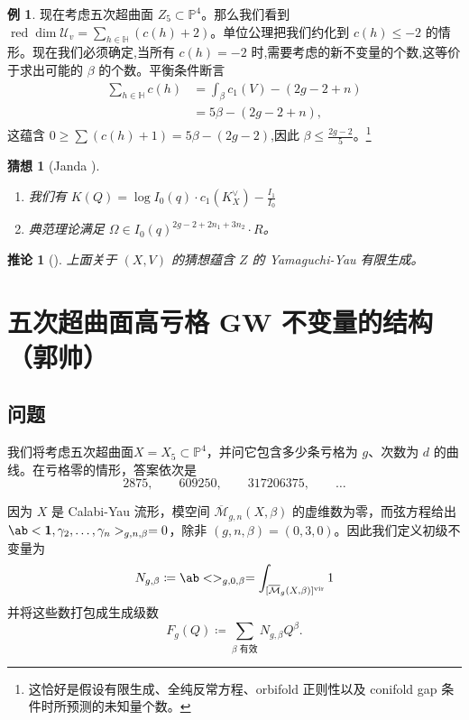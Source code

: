 \documentclass{amsart}
\newtheorem{cor}[thm]{推论}
\newtheorem{conj}[thm]{猜想}
\theoremstyle{definition}
\newtheorem{exm}[thm]{例}
\theoremstyle{remark}
\theoremstyle{plain}
\theoremstyle{definition}
\theoremstyle{remark}
\renewcommand{\H}{\mathbb{H}}
\renewcommand{\P}{\mathbb{P}}
\newcommand{\Mbar}{\overline{\mathcal{M}}}
\newcommand{\mc}[1]{\mathcal{#1}}
\newcommand{\mr}[1]{\mathrm{#1}}
\newcommand{\on}[1]{\operatorname{#1}}
\newcommand{\1}{\mathbf{1}}
\newcommand{\2}{\mathbf{2}}
\newcommand{\3}{\mathbf{3}}
\newcommand{\vir}{\mr{vir}}
\begin{document}
\begin{exm}
    现在考虑五次超曲面 \(Z_5 \subset \P^4\)。那么我们看到 \(\on{red}\dim \mc{U}_v = \sum_{h \in \H} (c(h)+2)\)。单位公理把我们约化到 \(c(h) \leq -2\) 的情形。现在我们必须确定,当所有 \(c(h) = -2\) 时,需要考虑的新不变量的个数,这等价于求出可能的 \(\beta\) 的个数。平衡条件断言
    \begin{align*}
        \sum_{h \in \H} c(h) &= \int_{\beta} c_1(V) - (2g-2+n) \\
        &= 5\beta - (2g-2+n),
    \end{align*}
    这蕴含 \(0 \geq \sum (c(h)+1) = 5\beta - (2g-2)\),因此 \(\beta \leq \frac{2g-2}{5}\)。\footnote{这恰好是假设有限生成、全纯反常方程、orbifold 正则性以及 conifold gap 条件时所预测的未知量个数。}
\end{exm}

\begin{conj}[Janda {\cite[Conjecture~1.6]{CJRtropical2025}}]\leavevmode
    \begin{enumerate}
        \item 我们有 \(K(Q) = \log I_0(q) \cdot c_1(K_X^{\vee}) - \frac{I_1}{I_0}\) \\
        \item 典范理论满足 \(\Omega \in I_0(q)^{2g-2+2n_1 + 3 n_2} \cdot R\)。
    \end{enumerate}
\end{conj}

\begin{cor}[{\cite[Theorem~1.7]{CJRtropical2025}}]
    上面关于 \((X, V)\) 的猜想蕴含 \(Z\) 的 Yamaguchi-Yau 有限生成。
\end{cor}
\section{五次超曲面高亏格 GW 不变量的结构 （郭帅）}%
\label{sec:Structure of higher-genus GW invariants of the quintic (Shuai Guo)}

\subsection{问题}%
\label{sub:The problem (Guo)}

我们将考虑五次超曲面\(X = X_5 \subset \P^4\)，并问它包含多少条亏格为 \(g\)、次数为 \(d\) 的曲线。在亏格零的情形，答案依次是
\[ 2875, \qquad 609250, \qquad 317206375, \qquad \ldots \]

因为 \(X\) 是 Calabi-Yau 流形，模空间 \(\Mbar_{g,n}(X,\beta)\) 的虚维数为零，而弦方程给出 \(\ab<\1, \gamma_2, \ldots, \gamma_n>_{g,n,\beta} = 0\)，除非 \((g,n,\beta) = (0,3,0)\)。因此我们定义初级不变量为
\[ N_{g,\beta} \coloneqq \ab<>_{g,0,\beta} = \int_{[\Mbar_g(X,\beta)]^{\vir}} 1 \]
并将这些数打包成生成级数
\[ F_g(Q) \coloneqq \sum_{\beta \text{ 有效}} N_{g,\beta}Q^{\beta}. \]
\end{document}
